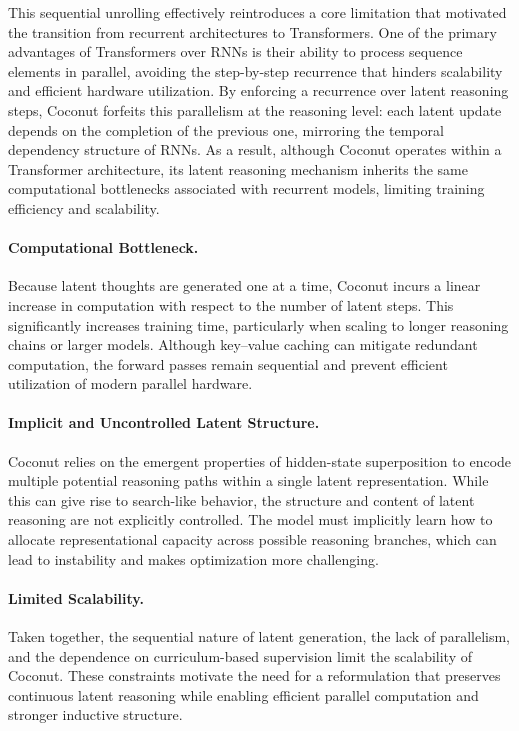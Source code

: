 This sequential unrolling effectively reintroduces a core limitation that motivated the transition from recurrent architectures to Transformers. One of the primary advantages of Transformers over RNNs is their ability to process sequence elements in parallel, avoiding the step-by-step recurrence that hinders scalability and efficient hardware utilization. By enforcing a recurrence over latent reasoning steps, Coconut forfeits this parallelism at the reasoning level: each latent update depends on the completion of the previous one, mirroring the temporal dependency structure of RNNs. As a result, although Coconut operates within a Transformer architecture, its latent reasoning mechanism inherits the same computational bottlenecks associated with recurrent models, limiting training efficiency and scalability.

\paragraph{Computational Bottleneck.}
Because latent thoughts are generated one at a time, Coconut incurs a linear increase in computation with respect to the number of latent steps. This significantly increases training time, particularly when scaling to longer reasoning chains or larger models. Although key--value caching can mitigate redundant computation, the forward passes remain sequential and prevent efficient utilization of modern parallel hardware.

\paragraph{Implicit and Uncontrolled Latent Structure.}
Coconut relies on the emergent properties of hidden-state superposition to encode multiple potential reasoning paths within a single latent representation. While this can give rise to search-like behavior, the structure and content of latent reasoning are not explicitly controlled. The model must implicitly learn how to allocate representational capacity across possible reasoning branches, which can lead to instability and makes optimization more challenging.

\paragraph{Limited Scalability.}
Taken together, the sequential nature of latent generation, the lack of parallelism, and the dependence on curriculum-based supervision limit the scalability of Coconut. These constraints motivate the need for a reformulation that preserves continuous latent reasoning while enabling efficient parallel computation and stronger inductive structure.

